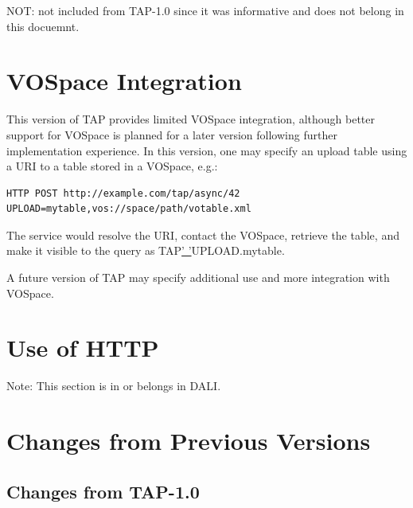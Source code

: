 \documentclass[11pt,a4paper]{ivoa}
\begin{document}
NOT: not included from TAP-1.0 since it was informative and does not belong in 
this docuemnt.

\section{VOSpace Integration}
This version of TAP provides limited VOSpace integration, although better 
support for VOSpace is planned for a later version following further 
implementation experience. In this version, one may specify an upload table 
using a URI to a table stored in a VOSpace, e.g.:
\begin{verbatim}
HTTP POST http://example.com/tap/async/42
UPLOAD=mytable,vos://space/path/votable.xml
\end{verbatim}
The service would resolve the URI, contact the VOSpace, retrieve the table, and 
make it visible to the query as TAP\underline{' '}UPLOAD.mytable.

A future version of TAP may specify additional use and more integration with 
VOSpace.

\section{Use of HTTP}
Note: This section is in or belongs in DALI.

\appendix

\section{Changes from Previous Versions}

\subsection{Changes from TAP-1.0}



\end{document}
